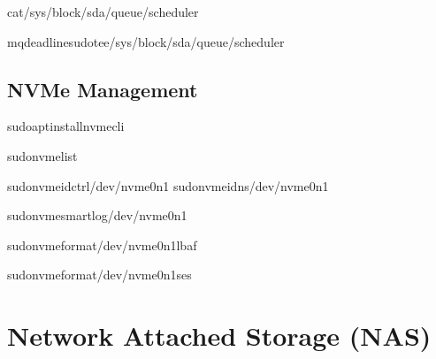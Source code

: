 \documentclass[letterpaper,10pt,english]{sphinxmanual}
\begin{document}
\sphinxAtStartPar
{}

\begin{sphinxVerbatim}[commandchars=\\\{\}]
cat/sys/block/sda/queue/scheduler

mq\PYGZhy{}deadlinesudotee/sys/block/sda/queue/scheduler

\end{sphinxVerbatim}


\subsection{NVMe Management}
\label{\detokenize{storage-devices:nvme-management}}
\begin{sphinxVerbatim}[commandchars=\\\{\}]
sudoaptinstallnvme\PYGZhy{}cli

sudonvmelist

sudonvmeid\PYGZhy{}ctrl/dev/nvme0n1
sudonvmeid\PYGZhy{}ns/dev/nvme0n1

sudonvmesmart\PYGZhy{}log/dev/nvme0n1

sudonvmeformat/dev/nvme0n1\PYGZhy{}\PYGZhy{}lbaf

sudonvmeformat/dev/nvme0n1\PYGZhy{}\PYGZhy{}ses
\end{sphinxVerbatim}


\section{Network Attached Storage (NAS)}
\label{\detokenize{storage-devices:network-attached-storage-nas}}
\end{document}
